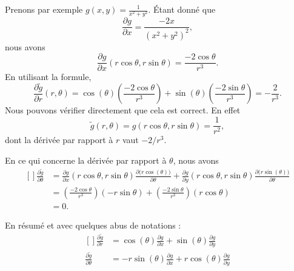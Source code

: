 Prenons par exemple $g(x,y)=\frac{1}{ x^2+y^2 }$. Étant donné que
\begin{equation}
    \frac{ \partial g }{ \partial x }=\frac{ -2x }{ (x^2+y^2)^2 },
\end{equation}
nous avons
\begin{equation}
    \frac{ \partial g }{ \partial x }(r\cos\theta,r\sin\theta)=\frac{ -2\cos\theta }{ r^3 }.
\end{equation}
En utilisant la formule,
\begin{equation}
    \frac{ \partial \tilde g }{ \partial r }(r,\theta)=\cos(\theta)\left( \frac{ -2\cos\theta }{ r^3 } \right)+\sin(\theta)\left( \frac{ -2\sin\theta }{ r^3 } \right)=-\frac{ 2 }{ r^3 }.
\end{equation}
Nous pouvons vérifier directement que cela est correct. En effet
\begin{equation}
    \tilde g(r,\theta)=g(r\cos\theta,r\sin\theta)=\frac{1}{ r^2 },
\end{equation}
dont la dérivée par rapport à $r$ vaut $-2/r^3$.

En ce qui concerne la dérivée par rapport à $\theta$, nous avons
\begin{equation}
    \begin{aligned}[]
    \frac{ \partial \tilde g }{ \partial \theta }&=\frac{ \partial g }{ \partial x }(r\cos\theta,r\sin\theta)\frac{ \partial \big( r\cos(\theta) \big) }{ \partial \theta }+\frac{ \partial g }{ \partial y }(r\cos\theta,r\sin\theta)\frac{ \partial \big( r\sin(\theta) \big) }{ \partial \theta }\\
    &=\left( \frac{ -2\cos\theta }{ r^3 } \right)(-r\sin\theta)+\left( \frac{ -2\sin\theta }{ r^3 } \right)(r\cos\theta)\\
    &=0.
    \end{aligned}
\end{equation}

En résumé et avec quelques abus de notations :
\begin{equation}
    \begin{aligned}[]
        \frac{ \partial \tilde g }{ \partial r }&=\cos(\theta)\frac{ \partial g }{ \partial x }+\sin(\theta)\frac{ \partial g }{ \partial y }\\
        \frac{ \partial \tilde g }{ \partial \theta }&=-r\sin(\theta)\frac{ \partial g }{ \partial x }+r\cos(\theta)\frac{ \partial g }{ \partial y }\\
    \end{aligned}
\end{equation}

